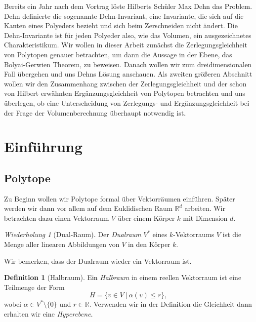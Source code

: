 \documentclass[11pt,titlepage]{article}
\newcommand{\setR}{\mathbb{R}}
\theoremstyle{definition}
\newtheorem{definition}[theorem]{Definition}
\theoremstyle{remark}
\newtheorem*{repetition}{Wiederholung}
\begin{document}
	Bereits ein Jahr nach dem Vortrag löste Hilberts Schüler Max Dehn 
	das Problem. Dehn definierte die sogenannte Dehn-Invariant, eine 
	Invariante, die sich auf die Kanten eines Polyeders bezieht und sich 
	beim Zerschneiden nicht ändert. Die Dehn-Invariante ist für jeden Polyeder 
	also, wie das Volumen, ein ausgezeichnetes Charakteristikum. 
	Wir wollen in dieser Arbeit zunächst die Zerlegungsgleichheit 
	von Polytopen genauer betrachten, um dann die Aussage in der Ebene, 
	das Bolyai-Gerwien Theorem, zu beweisen. Danach wollen wir zum 
	dreidimensionalen Fall übergehen und uns Dehns Lösung anschauen. 
	Als zweiten größeren Abschnitt wollen wir den Zusammenhang zwischen 
	der Zerlegungsgleichheit und der schon 
	von Hilbert erwähnten Ergänzungsgleichheit von Polytopen 
	betrachten und uns überlegen, ob eine Unterscheidung von Zerlegungs- 
	und Ergänzungsgleichheit bei der Frage der Volumenberechnung überhaupt 
	notwendig ist. 
	
	\newpage
	
	\section{Einführung}
	
	\subsection{Polytope}
	
	Zu Beginn wollen wir Polytope formal über Vektorräumen einführen. Später werden 
	wir dann vor allem auf dem Euklidischen Raum $\setR^d$ arbeiten. 
	Wir betrachten dazu einen Vektorraum $V$ über einem Körper $k$ mit Dimension $d$. 
	
	\begin{repetition}[Dual-Raum]
		Der \textsl{Dualraum} $V^*$ eines $k$-Vektorraums $V$ ist die Menge aller linearen Abbildungen von $V$ in den Körper $k$.
	\end{repetition}
	Wir bemerken, dass der Dualraum wieder ein Vektorraum ist.
	
	\begin{definition}[Halbraum]
		Ein \textsl{Halbraum} in einem reellen Vektorraum ist eine Teilmenge 
		der Form
		\[ H= \{ v\in V \  \vert\  \alpha(v)\leq r \}, \]
		wobei $\alpha\in V^*\setminus\{0\}$ und $r\in\setR$. Verwenden 
		wir in der Definition die Gleichheit dann erhalten wir eine
		\textsl{Hyperebene}.
	\end{definition}
	
\end{document}
